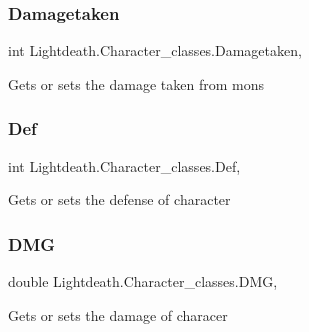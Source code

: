 \subsubsection{\texorpdfstring{Damagetaken}{Damagetaken}}
{\footnotesize\ttfamily int Lightdeath.\+Character\+\_\+classes.\+Damagetaken\hspace{0.3cm}{\ttfamily [get]}, {\ttfamily [set]}}



Gets or sets the damage taken from mons 

\hypertarget{class_lightdeath_1_1_character__classes_a3ee38ddaad13fe78a38774e841053be0}{}\label{class_lightdeath_1_1_character__classes_a3ee38ddaad13fe78a38774e841053be0} 
\subsubsection{\texorpdfstring{Def}{Def}}
{\footnotesize\ttfamily int Lightdeath.\+Character\+\_\+classes.\+Def\hspace{0.3cm}{\ttfamily [get]}, {\ttfamily [set]}}



Gets or sets the defense of character 

\hypertarget{class_lightdeath_1_1_character__classes_addda735b67d96c7cb2109938a710aac1}{}\label{class_lightdeath_1_1_character__classes_addda735b67d96c7cb2109938a710aac1} 
\subsubsection{\texorpdfstring{D\+MG}{DMG}}
{\footnotesize\ttfamily double Lightdeath.\+Character\+\_\+classes.\+D\+MG\hspace{0.3cm}{\ttfamily [get]}, {\ttfamily [set]}}



Gets or sets the damage of characer 

\hypertarget{class_lightdeath_1_1_character__classes_a1d2eac71218ba80909899ad9badf523e}{}\label{class_lightdeath_1_1_character__classes_a1d2eac71218ba80909899ad9badf523e} 
